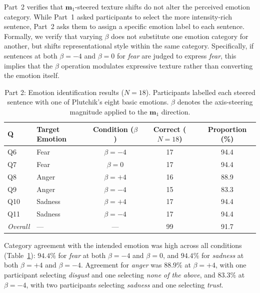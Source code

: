 Part~2 verifies that $\mathbf{m}_1$-steered texture shifts do not alter the perceived emotion category. While Part~1 asked participants to select the more intensity-rich sentence, Part~2 asks them to assign a specific emotion label to each sentence. Formally, we verify that varying $\beta$ does not substitute one emotion category for another, but shifts representational style within the same category. Specifically, if sentences at both $\beta=-4$ and $\beta=0$ for \textit{fear} are judged to express \textit{fear}, this implies that the $\beta$ operation modulates expressive texture rather than converting the emotion itself.\par

\begin{table}[H]
\centering
\small
\begin{tabular}{llccc}
\toprule
\textbf{Q} & \textbf{Target Emotion} & \textbf{Condition ($\beta$)} & \textbf{Correct ($N=18$)} & \textbf{Proportion (\%)} \\
\midrule
Q6  & Fear    & $\beta = -4$ & 17 & 94.4 \\
Q7  & Fear    & $\beta = 0$  & 17 & 94.4 \\
\midrule
Q8  & Anger   & $\beta = +4$ & 16 & 88.9 \\
Q9  & Anger   & $\beta = -4$ & 15 & 83.3 \\
\midrule
Q10 & Sadness & $\beta = +4$ & 17 & 94.4 \\
Q11 & Sadness & $\beta = -4$ & 17 & 94.4 \\
\midrule
\textit{Overall} & --- & --- & 99 & 91.7 \\
\bottomrule
\end{tabular}
\caption{Part 2: Emotion identification results ($N = 18$). Participants labelled each steered sentence with one of Plutchik's eight basic emotions. $\beta$ denotes the axis-steering magnitude applied to the $\mathbf{m}_1$ direction.}
\label{tab:human_eval_p2}
\end{table}

Category agreement with the intended emotion was high across all conditions (Table~\ref{tab:human_eval_p2}): $94.4\%$ for \textit{fear} at both $\beta = -4$ and $\beta = 0$, and $94.4\%$ for \textit{sadness} at both $\beta = +4$ and $\beta = -4$. Agreement for \textit{anger} was $88.9\%$ at $\beta = +4$, with one participant selecting \textit{disgust} and one selecting \textit{none of the above}, and $83.3\%$ at $\beta = -4$, with two participants selecting \textit{sadness} and one selecting \textit{trust}. \par

